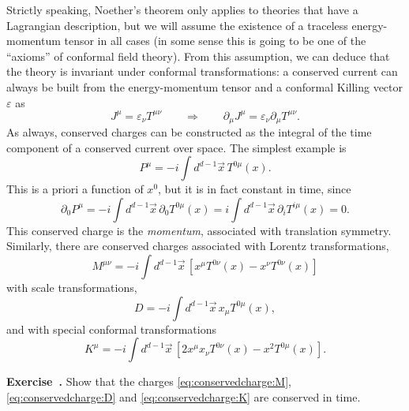 \documentclass[a4paper,12pt]{article}
\numberwithin{equation}{section}
\newcounter{exercise}[section]
\newenvironment{exercise}[1][]%
	{\refstepcounter{exercise}\bigskip
	\begin{mdframed}[backgroundcolor=gray!20, linewidth=0]
	\noindent\textbf{Exercise~\thesection.\theexercise #1} \rmfamily}
  	{\end{mdframed}\bigskip}
\begin{document}
Strictly speaking, Noether's theorem only applies to theories that have a Lagrangian description, but we will assume the existence of a traceless energy-momentum tensor in all cases (in some sense this is going to be one of the ``axioms'' of conformal field theory).
From this assumption, we can deduce that the theory is invariant under conformal transformations: a conserved current can always be built from the energy-momentum tensor and a conformal Killing vector $\varepsilon$ as
\begin{equation}
	J^\mu = \varepsilon_\nu T^{\mu\nu}
	\qquad\Rightarrow\qquad
	\partial_\mu J^\mu
	= \varepsilon_\nu \partial_\mu T^{\mu\nu}.
\end{equation}
As always, conserved charges can be constructed as the integral of the time component of a conserved current over space. The simplest example is 
\begin{equation}
	P^\mu = -i \int d^{d-1}\vec{x}\, T^{0\mu}(x).
	\label{eq:conservedcharge:P}
\end{equation}
This is a priori a function of $x^0$, but it is in fact constant in time, since
\begin{equation}
	\partial_0 P^\mu
	= -i \int d^{d-1}\vec{x}\, \partial_0 T^{0\mu}(x)
	= i \int d^{d-1}\vec{x}\, \partial_i T^{i\mu}(x) = 0.
\end{equation}
This conserved charge is the \emph{momentum}, associated with translation symmetry. Similarly, there are conserved charges associated with Lorentz transformations,
\begin{equation}
	M^{\mu\nu} = -i \int d^{d-1}\vec{x}\, \left[
	x^\mu T^{0\nu}(x) - x^\nu T^{0\nu}(x) \right]
	\label{eq:conservedcharge:M}
\end{equation}
with scale transformations,
\begin{equation}
	D = -i \int d^{d-1}\vec{x}\, x_\mu T^{0\mu}(x),
	\label{eq:conservedcharge:D}
\end{equation}
and with special conformal transformations
\begin{equation}
	K^\mu = -i \int d^{d-1}\vec{x} \,
	\left[ 2 x^\mu x_\nu T^{0\nu}(x) - x^2 T^{0\mu}(x) \right].
	\label{eq:conservedcharge:K}
\end{equation}
%
\begin{exercise}
	Show that the charges \eqref{eq:conservedcharge:M},
	\eqref{eq:conservedcharge:D} and \eqref{eq:conservedcharge:K}
	are conserved in time.
\end{exercise}
\end{document}
